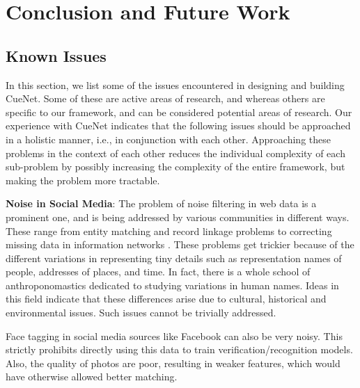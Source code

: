 \chapter{Conclusion and Future Work}

\section{Known Issues}
In this section, we list some of the issues encountered in designing and building CueNet. Some of these are active areas of research, and whereas others are specific to our framework, and can be considered potential areas of research. Our experience with CueNet indicates that the following issues should be approached in a holistic manner, i.e., in conjunction with each other. Approaching these problems in the context of each other reduces the individual complexity of each sub-problem by possibly increasing the complexity of the entire framework, but making the problem more tractable.

\textbf{\textbf{Noise in Social Media}}: The problem of noise filtering in web data is a prominent one, and is being addressed by various communities in different ways. These range from entity matching and record linkage problems \cite{elmagarmid2007duplicate} to correcting missing data in information networks \cite{sadikov2011correcting}. These problems get trickier because of the different variations in representing tiny details such as representation names of people, addresses of places, and time. In fact, there is a whole school of anthroponomastics \cite{schneider2009s} dedicated to studying variations in human names. Ideas in this field indicate that these differences arise due to cultural, historical and environmental issues\cite{al2009socio}. Such issues cannot be trivially addressed. 

%
%

Face tagging in social media sources like Facebook can also be very noisy. This strictly prohibits directly using this data to train verification/recognition models. Also, the quality of photos are poor, resulting in weaker features, which would have otherwise allowed better matching. 


